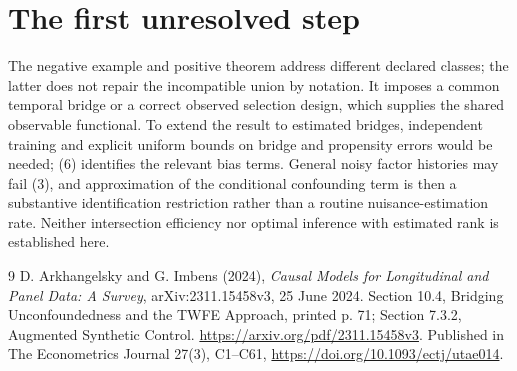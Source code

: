 \documentclass[11pt]{article}
\theoremstyle{remark}
\begin{document}
\section{The first unresolved step}
The negative example and positive theorem address different declared
classes; the latter does not repair the incompatible union by notation.
It imposes a common temporal bridge or a correct observed selection design,
which supplies the shared observable functional. To extend the result to
estimated bridges, independent training and explicit uniform bounds on
bridge and propensity errors would be needed; (6) identifies the relevant
bias terms. General noisy factor histories may fail (3), and approximation
of the conditional confounding term is then a substantive identification
restriction rather than a routine nuisance-estimation rate. Neither
intersection efficiency nor optimal inference with estimated rank is
established here.

\begin{thebibliography}{9}
 D. Arkhangelsky and G. Imbens (2024),
\emph{Causal Models for Longitudinal and Panel Data: A Survey},
arXiv:2311.15458v3, 25 June 2024. Section 10.4, Bridging
Unconfoundedness and the TWFE Approach, printed p. 71; Section 7.3.2,
Augmented Synthetic Control.
\url{https://arxiv.org/pdf/2311.15458v3}.
Published in The Econometrics Journal 27(3), C1--C61,
\url{https://doi.org/10.1093/ectj/utae014}.
\end{thebibliography}
\end{document}
